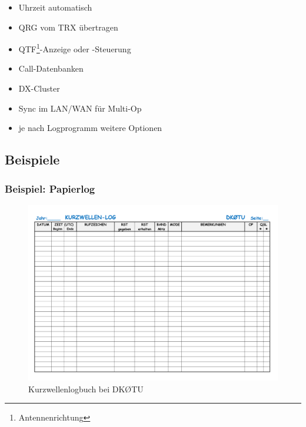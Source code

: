 \begin{frame}
  \begin{center}
    \begin{itemize}
      \item Uhrzeit automatisch
      \item QRG vom TRX übertragen
      \item QTF\footnote{Antennenrichtung}-Anzeige oder -Steuerung
      \item Call-Datenbanken
      \item DX-Cluster
      \item Sync im LAN/WAN für Multi-Op
      \item je nach Logprogramm weitere Optionen
    \end{itemize}
  \end{center}

\end{frame}

\subsection{Beispiele}

\begin{frame}
  \frametitle{Beispiel: Papierlog}

  \begin{center}
    \begin{figure}
      \includegraphics[height=.75\textheight]{bv13/dk0tu_log_kw.png}
      \caption{Kurzwellenlogbuch bei DKØTU}
    \end{figure}
  \end{center}

\end{frame}

